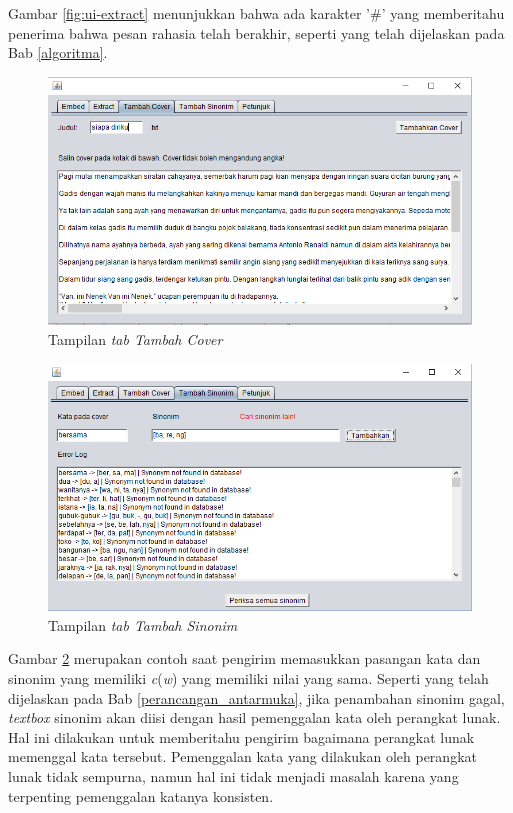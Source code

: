 Gambar \ref{fig:ui-extract} menunjukkan bahwa ada karakter '\#' yang memberitahu penerima bahwa pesan rahasia telah berakhir, seperti yang telah dijelaskan pada Bab \ref{algoritma}.

\begin{figure}[H]
	\centering
	\includegraphics[scale=0.8]{Gambar/ui-tambah-cover}
	\caption{Tampilan \textit{tab Tambah Cover}} 
	\label{fig:ui-tambah-cover}
\end{figure}

\begin{figure}[H]
	\centering
	\includegraphics[scale=0.8]{Gambar/ui-tambah-sinonim}
	\caption{Tampilan \textit{tab Tambah Sinonim}} 
	\label{fig:ui-tambah-sinonim}
\end{figure}

Gambar \ref{fig:ui-tambah-sinonim} merupakan contoh saat pengirim memasukkan pasangan kata dan sinonim yang memiliki \textit{c}(\textit{w}) yang memiliki nilai yang sama. Seperti yang telah dijelaskan pada Bab \ref{perancangan_antarmuka}, jika penambahan sinonim gagal, \textit{textbox} sinonim akan diisi dengan hasil pemenggalan kata oleh perangkat lunak. Hal ini dilakukan untuk memberitahu pengirim bagaimana perangkat lunak memenggal kata tersebut. Pemenggalan kata yang dilakukan oleh perangkat lunak tidak sempurna, namun hal ini tidak menjadi masalah karena yang terpenting pemenggalan katanya konsisten.

